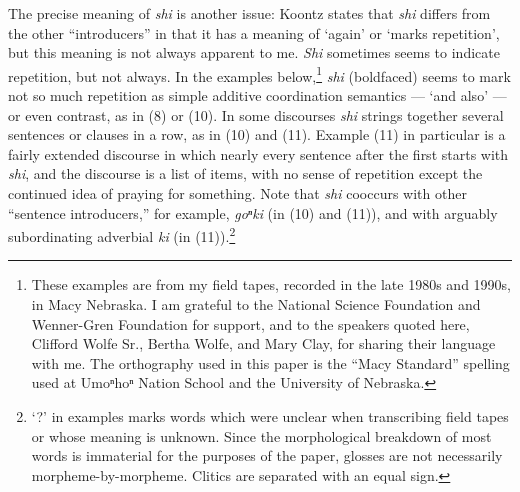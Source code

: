 \documentclass[output=paper]{LSP/langsci}
\begin{document}
The precise meaning of \textit{shi} is another issue:  Koontz states that \textit{shi} differs from the other ``introducers'' in that it has a meaning of `again' or `marks repetition', but this meaning is not always apparent to me. \textit{Shi} sometimes seems to indicate repetition, but not always.  In the examples below,\footnote{These examples are from my field tapes, recorded in the late 1980s and 1990s, in Macy Nebraska. I am grateful to the National Science Foundation and Wenner-Gren Foundation for support, and to the speakers quoted here, Clifford Wolfe Sr., Bertha Wolfe, and Mary Clay, for sharing their language with me. The orthography used in this paper is the ``Macy Standard'' spelling used at Umoⁿhoⁿ Nation School and the University of Nebraska.}   \textit{shi} (boldfaced) seems to mark not so much repetition as simple additive coordination semantics --- `and also' --- or even contrast, as in (8) or (10).  In some discourses \textit{shi} strings together several sentences or clauses in a row, as in (10) and (11).  Example (11) in particular is a fairly extended discourse in which nearly every sentence after the first starts with \textit{shi}, and the discourse is a list of items, with no sense of repetition except the continued idea of praying for something. Note that \textit{shi} cooccurs with other ``sentence introducers,'' for example, \textit{goⁿki} (in (10) and (11)), and with arguably subordinating adverbial \textit{ki} (in (11)).\footnote{`?' in examples marks words which were unclear when transcribing field tapes or whose meaning is unknown. Since the morphological breakdown of most words is immaterial for the purposes of the paper, glosses are not necessarily morpheme-by-morpheme. Clitics are separated with an equal sign.}
\end{document}
